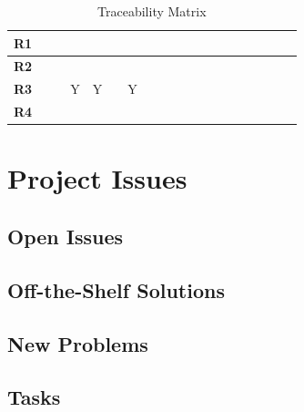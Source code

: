 \documentclass{article}
\begin{document}
\begin{table}[H]
\begin{adjustwidth}{-1.87in}{-1in}
\begin{tabular}{c|c|c|c|c|c|c|c|c|c|c|c|c|c|c|c|c|c|c|}
\multicolumn{1}{|c|}{\textbf{R1}}   &              &              &              &              &              &              &              &              &              &              &              &              &              &              &             &             &             &             \\ \hline
\multicolumn{1}{|c|}{\textbf{R2}}   &              &              &              &              &              &              &              &              &              &              &              &              &              &              &             &             &             &             \\ \hline
\multicolumn{1}{|c|}{\textbf{R3}}   &              &              & Y            & Y            &              & Y            &              &              &              &              &              &              &              &              &             &             &             &             \\ \hline
\multicolumn{1}{|c|}{\textbf{R4}}   &              &              &              &              &              &              &              &              &              &              &              &              &              &              &             &             &             &             \\ \hline
\end{tabular}
\caption{Traceability Matrix}
    \label{tab:my_label}
\end{adjustwidth}
\end{table}

\section{Project Issues}

\subsection{Open Issues}

\subsection{Off-the-Shelf Solutions}

\subsection{New Problems}

\subsection{Tasks}
\end{document}
